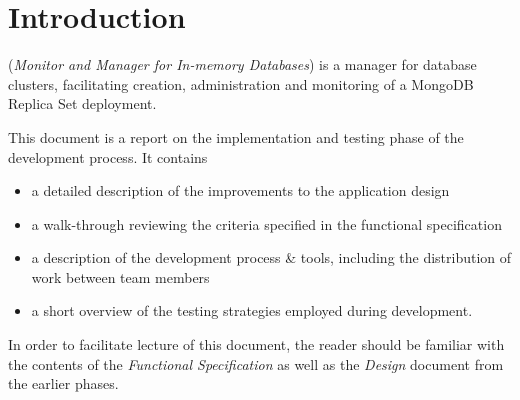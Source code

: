 \section{Introduction}

\mamid (\emph{Monitor and Manager for In-memory Databases}) is a manager for database clusters, facilitating creation,
administration and monitoring of a MongoDB Replica Set deployment.

This document is a report on the implementation and testing phase of the development process. It contains

\begin{itemize}
        \item a detailed description of the improvements to the application design
        \item a walk-through reviewing the criteria specified in the functional specification
        \item a description of the development process \& tools, including the distribution of work between team members
        \item a short overview of the testing strategies employed during development.
\end{itemize}

In order to facilitate lecture of this document, the reader should be familiar with the contents of the \emph{Functional Specification}
as well as the \emph{Design} document from the earlier phases.

